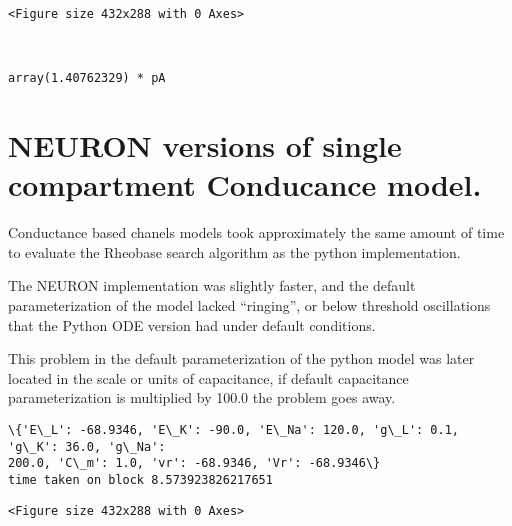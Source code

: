    
    \begin{verbatim}
<Figure size 432x288 with 0 Axes>
    \end{verbatim}

    
    \begin{center}
    \end{center}
    { \hspace*{\fill} \\}
    
            \begin{tcolorbox}[breakable, size=fbox, boxrule=.5pt, pad at break*=1mm, opacityfill=0]
\begin{Verbatim}[commandchars=\\\{\}]
array(1.40762329) * pA
\end{Verbatim}
\end{tcolorbox}
        
    \hypertarget{neuron-versions-of-single-compartment-conducance-model.}{%
\section{NEURON versions of single compartment Conducance
model.}\label{neuron-versions-of-single-compartment-conducance-model.}}

Conductance based chanels models took approximately the same amount of
time to evaluate the Rheobase search algorithm as the python
implementation.

The NEURON implementation was slightly faster, and the default
parameterization of the model lacked ``ringing'', or below threshold
oscillations that the Python ODE version had under default conditions.

This problem in the default parameterization of the python model was
later located in the scale or units of capacitance, if default
capacitance parameterization is multiplied by 100.0 the problem goes
away.

    \begin{Verbatim}[commandchars=\\\{\}]
\{'E\_L': -68.9346, 'E\_K': -90.0, 'E\_Na': 120.0, 'g\_L': 0.1, 'g\_K': 36.0, 'g\_Na':
200.0, 'C\_m': 1.0, 'vr': -68.9346, 'Vr': -68.9346\}
time taken on block 8.573923826217651
    \end{Verbatim}

    
    \begin{verbatim}
<Figure size 432x288 with 0 Axes>
    \end{verbatim}

